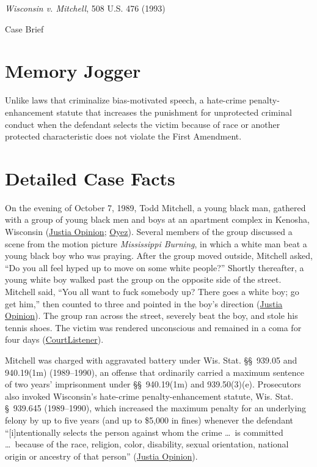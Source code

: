 \documentclass[12pt]{article}
\begin{document}
\begin{center}
{\LARGE \textit{Wisconsin v. Mitchell}, 508 U.S. 476 (1993)\par}
\vspace{0.8em}
{\large Case Brief\par}
\end{center}
\vspace{1em}

\section{Memory Jogger}
Unlike laws that criminalize bias-motivated speech, a hate-crime penalty-enhancement statute that increases the punishment for unprotected criminal conduct when the defendant selects the victim because of race or another protected characteristic does not violate the First Amendment.

\section{Detailed Case Facts}
On the evening of October 7, 1989, Todd Mitchell, a young black man, gathered with a group of young black men and boys at an apartment complex in Kenosha, Wisconsin (\href{https://supreme.justia.com/cases/federal/us/508/476/}{Justia Opinion}; \href{https://www.oyez.org/cases/1992/92-515}{Oyez}). Several members of the group discussed a scene from the motion picture \textit{Mississippi Burning}, in which a white man beat a young black boy who was praying. After the group moved outside, Mitchell asked, ``Do you all feel hyped up to move on some white people?'' Shortly thereafter, a young white boy walked past the group on the opposite side of the street. Mitchell said, ``You all want to fuck somebody up? There goes a white boy; go get him,'' then counted to three and pointed in the boy's direction (\href{https://supreme.justia.com/cases/federal/us/508/476/}{Justia Opinion}). The group ran across the street, severely beat the boy, and stole his tennis shoes. The victim was rendered unconscious and remained in a coma for four days (\href{https://www.courtlistener.com/opinion/112879/wisconsin-v-mitchell/}{CourtListener}).

Mitchell was charged with aggravated battery under Wis. Stat. \S\S~939.05 and 940.19(1m) (1989--1990), an offense that ordinarily carried a maximum sentence of two years' imprisonment under \S\S~940.19(1m) and 939.50(3)(e). Prosecutors also invoked Wisconsin's hate-crime penalty-enhancement statute, Wis. Stat. \S~939.645 (1989--1990), which increased the maximum penalty for an underlying felony by up to five years (and up to \$5,000 in fines) whenever the defendant ``[i]ntentionally selects the person against whom the crime \ldots\ is committed \ldots\ because of the race, religion, color, disability, sexual orientation, national origin or ancestry of that person'' (\href{https://supreme.justia.com/cases/federal/us/508/476/}{Justia Opinion}).
\end{document}
